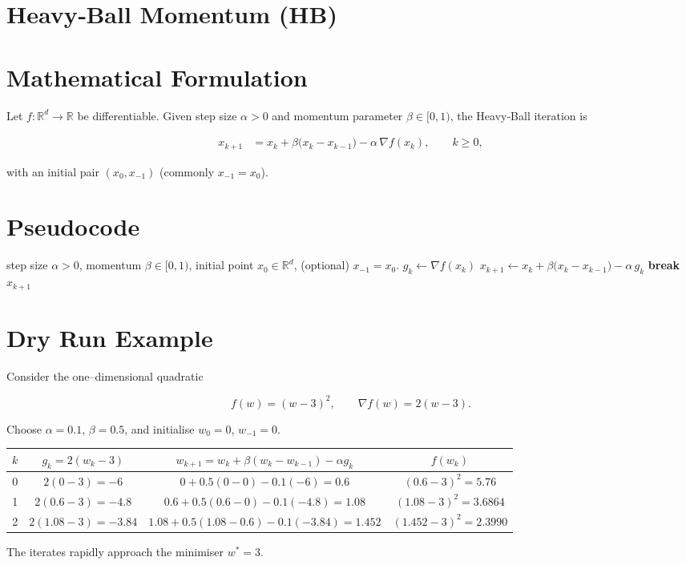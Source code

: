 \documentclass[11pt]{article}
\newcommand{\grad}{\nabla}
\begin{document}
\section*{Heavy‑Ball Momentum (HB)}

\section*{Mathematical Formulation}
Let $f:\mathbb R^{d}\rightarrow\mathbb R$ be differentiable.  
Given step size $\alpha>0$ and momentum parameter $\beta\in[0,1)$, the
Heavy‑Ball iteration is  

\[
\boxed{
\begin{aligned}
x_{k+1}&=x_{k}+\beta\bigl(x_{k}-x_{k-1}\bigr)-\alpha\,\grad f(x_{k}),\qquad k\ge 0,
\end{aligned}}
\tag{HB}
\]

with an initial pair $(x_{0},x_{-1})$ (commonly $x_{-1}=x_{0}$).

\section*{Pseudocode}
\begin{algorithm}[H]
\caption{Heavy‑Ball Momentum}
\begin{algorithmic}[1]
\REQUIRE step size $\alpha>0$, momentum $\beta\in[0,1)$,
          initial point $x_{0}\in\mathbb R^{d}$,
          (optional) $x_{-1}=x_{0}$.
    \STATE $g_{k}\gets\grad f(x_{k})$ 
    \STATE $x_{k+1}\gets x_{k}+\beta\bigl(x_{k}-x_{k-1}\bigr)-\alpha\,g_{k}$ \label{line:update}
        \STATE \textbf{break}
    \ENDIF
\ENDFOR
\RETURN $x_{k+1}$
\end{algorithmic}
\end{algorithm}

\section*{Dry Run Example}
Consider the one–dimensional quadratic  

\[
f(w)=(w-3)^{2},\qquad\grad f(w)=2(w-3).
\]

Choose $\alpha=0.1$, $\beta=0.5$, and initialise $w_{0}=0$, $w_{-1}=0$.

\begin{center}
\begin{tabular}{c|c|c|c}
$k$ & $g_{k}=2(w_{k}-3)$ & $w_{k+1}=w_{k}+\beta(w_{k}-w_{k-1})-\alpha g_{k}$ & $f(w_{k})$\\\hline
0 & $2(0-3)=-6$ & $0+0.5(0-0)-0.1(-6)=0.6$ & $(0.6-3)^{2}=5.76$\\
1 & $2(0.6-3)=-4.8$ & $0.6+0.5(0.6-0)-0.1(-4.8)=1.08$ & $(1.08-3)^{2}=3.6864$\\
2 & $2(1.08-3)=-3.84$ & $1.08+0.5(1.08-0.6)-0.1(-3.84)=1.452$ & $(1.452-3)^{2}=2.3990$
\end{tabular}
\end{center}
The iterates rapidly approach the minimiser $w^{*}=3$.
\end{document}
